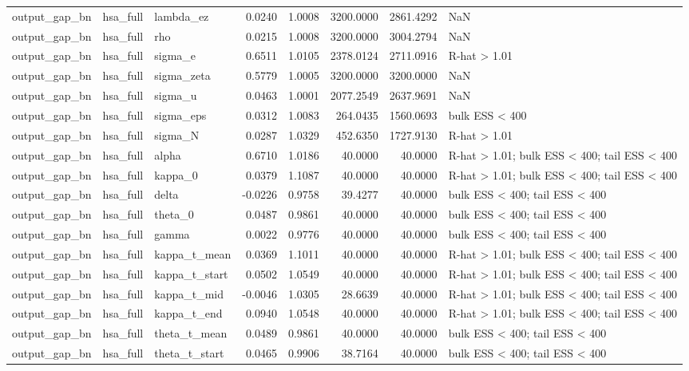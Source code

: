 \begin{tabular}{lllrrrrl}
output\_gap\_bn & hsa\_full & lambda\_ez & 0.0240 & 1.0008 & 3200.0000 & 2861.4292 & NaN \\
output\_gap\_bn & hsa\_full & rho & 0.0215 & 1.0008 & 3200.0000 & 3004.2794 & NaN \\
output\_gap\_bn & hsa\_full & sigma\_e & 0.6511 & 1.0105 & 2378.0124 & 2711.0916 & R-hat > 1.01 \\
output\_gap\_bn & hsa\_full & sigma\_zeta & 0.5779 & 1.0005 & 3200.0000 & 3200.0000 & NaN \\
output\_gap\_bn & hsa\_full & sigma\_u & 0.0463 & 1.0001 & 2077.2549 & 2637.9691 & NaN \\
output\_gap\_bn & hsa\_full & sigma\_eps & 0.0312 & 1.0083 & 264.0435 & 1560.0693 & bulk ESS < 400 \\
output\_gap\_bn & hsa\_full & sigma\_N & 0.0287 & 1.0329 & 452.6350 & 1727.9130 & R-hat > 1.01 \\
output\_gap\_bn & hsa\_full & alpha & 0.6710 & 1.0186 & 40.0000 & 40.0000 & R-hat > 1.01; bulk ESS < 400; tail ESS < 400 \\
output\_gap\_bn & hsa\_full & kappa\_0 & 0.0379 & 1.1087 & 40.0000 & 40.0000 & R-hat > 1.01; bulk ESS < 400; tail ESS < 400 \\
output\_gap\_bn & hsa\_full & delta & -0.0226 & 0.9758 & 39.4277 & 40.0000 & bulk ESS < 400; tail ESS < 400 \\
output\_gap\_bn & hsa\_full & theta\_0 & 0.0487 & 0.9861 & 40.0000 & 40.0000 & bulk ESS < 400; tail ESS < 400 \\
output\_gap\_bn & hsa\_full & gamma & 0.0022 & 0.9776 & 40.0000 & 40.0000 & bulk ESS < 400; tail ESS < 400 \\
output\_gap\_bn & hsa\_full & kappa\_t\_mean & 0.0369 & 1.1011 & 40.0000 & 40.0000 & R-hat > 1.01; bulk ESS < 400; tail ESS < 400 \\
output\_gap\_bn & hsa\_full & kappa\_t\_start & 0.0502 & 1.0549 & 40.0000 & 40.0000 & R-hat > 1.01; bulk ESS < 400; tail ESS < 400 \\
output\_gap\_bn & hsa\_full & kappa\_t\_mid & -0.0046 & 1.0305 & 28.6639 & 40.0000 & R-hat > 1.01; bulk ESS < 400; tail ESS < 400 \\
output\_gap\_bn & hsa\_full & kappa\_t\_end & 0.0940 & 1.0548 & 40.0000 & 40.0000 & R-hat > 1.01; bulk ESS < 400; tail ESS < 400 \\
output\_gap\_bn & hsa\_full & theta\_t\_mean & 0.0489 & 0.9861 & 40.0000 & 40.0000 & bulk ESS < 400; tail ESS < 400 \\
output\_gap\_bn & hsa\_full & theta\_t\_start & 0.0465 & 0.9906 & 38.7164 & 40.0000 & bulk ESS < 400; tail ESS < 400 \\

\end{tabular}

